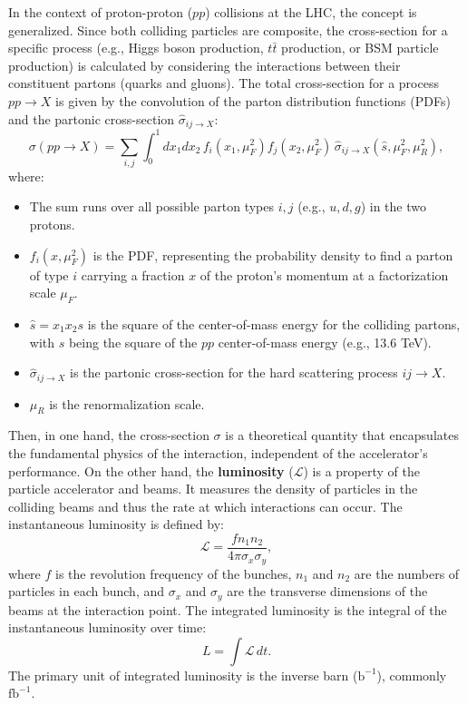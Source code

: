 In the context of proton-proton ($pp$) collisions at the LHC, the concept is generalized. Since both colliding particles are composite, the cross-section for a specific process (e.g., Higgs boson production, $t\bar{t}$ production, or BSM particle production) is calculated by considering the interactions between their constituent partons (quarks and gluons). The total cross-section for a process $pp \to X$ is given by the convolution of the parton distribution functions (PDFs) and the partonic cross-section $\hat{\sigma}_{ij \to X}$:
\begin{equation}
\sigma(pp \to X) = \sum_{i,j} \int_0^1 dx_1 dx_2\, f_i(x_1, \mu_F^2) f_j(x_2, \mu_F^2)\, \hat{\sigma}_{ij \to X}(\hat{s}, \mu_F^2, \mu_R^2),
\label{eq:cross_section}
\end{equation}
where:
\begin{itemize}
    \item The sum runs over all possible parton types $i, j$ (e.g., $u, d, g$) in the two protons.
    \item $f_i(x, \mu_F^2)$ is the PDF, representing the probability density to find a parton of type $i$ carrying a fraction $x$ of the proton's momentum at a factorization scale $\mu_F$.
		\item $\hat{s} = x_1 x_2 s$ is the square of the center-of-mass energy for the colliding partons, with $s$ being the square of the $pp$ center-of-mass energy (e.g., 13.6 TeV).
    \item $\hat{\sigma}_{ij \to X}$ is the partonic cross-section for the hard scattering process $ij \to X$.
    \item $\mu_R$ is the renormalization scale.
\end{itemize}
Then, in one hand, the cross-section $\sigma$ is a theoretical quantity that encapsulates the fundamental physics of the interaction, independent of the accelerator's performance. On the other hand, the \textbf{luminosity} ($\mathcal{L}$) is a property of the particle accelerator and beams. It measures the density of particles in the colliding beams and thus the rate at which interactions can occur. The instantaneous luminosity is defined by:
\begin{equation}
\mathcal{L} = \frac{f n_1 n_2}{4\pi \sigma_x \sigma_y},
\end{equation}
where $f$ is the revolution frequency of the bunches, $n_1$ and $n_2$ are the numbers of particles in each bunch, and $\sigma_x$ and $\sigma_y$ are the transverse dimensions of the beams at the interaction point. The integrated luminosity is the integral of the instantaneous luminosity over time:
\begin{equation}
L = \int \mathcal{L}\, dt.
\end{equation}
The primary unit of integrated luminosity is the inverse barn ($\text{b}^{-1}$), commonly $\text{fb}^{-1}$.

